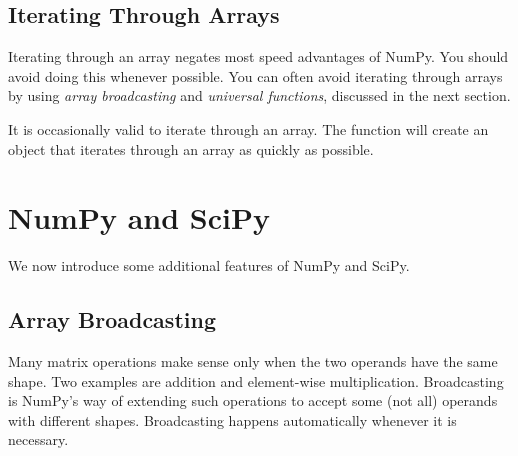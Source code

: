 \subsection*{Iterating Through Arrays}

Iterating through an array negates most speed advantages of NumPy. 
You should avoid doing this whenever possible.
You can often avoid iterating through arrays by using \emph{array broadcasting} and \emph{universal functions}, discussed in the next section.

It is occasionally valid to iterate through an array. 
The function  will create an object that iterates through an array as quickly as possible.


\section*{NumPy and SciPy}
We now introduce some additional features of NumPy and SciPy.

\subsection*{Array Broadcasting}
Many matrix operations make sense only when the two operands have the same shape. 
Two examples are addition and element-wise multiplication. 
Broadcasting is NumPy's way of extending such operations to accept some (not all) operands with different shapes. 
Broadcasting happens automatically whenever it is necessary. 

